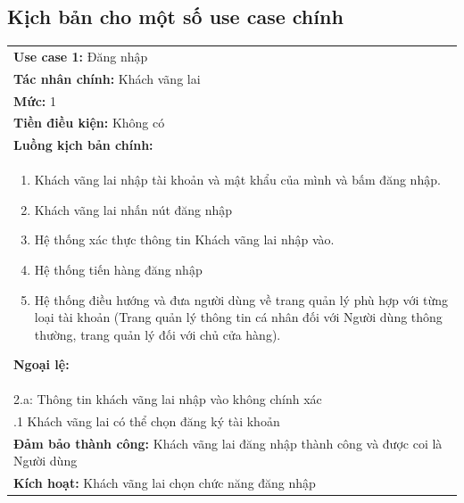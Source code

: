 \subsection{Kịch bản cho một số use case chính}
\begin{center}
\begin{tabularx}{\linewidth}{|X|}
\cline{1-2}
    \textbf{Use case 1:} Đăng nhập\\
    \textbf{Tác nhân chính:} Khách vãng lai\\
    \textbf{Mức:} 1\\
    \textbf{Tiền điều kiện:} Không có\\
    \textbf{Luồng kịch bản chính:}\\
    \begin{enumerate}
        \vspace{-2em}
        \itemsep-0.5em
        \item Khách vãng lai nhập tài khoản và mật khẩu của mình và bấm đăng nhập.
        \item Khách vãng lai nhấn nút đăng nhập
        \item Hệ thống xác thực thông tin Khách vãng lai nhập vào.
        \item Hệ thống tiến hàng đăng nhập
        \item Hệ thống điều hướng và đưa người dùng về trang quản lý phù hợp với từng loại tài khoản (Trang quản lý thông tin cá nhân đối với Người dùng thông thường, trang quản lý đối với chủ cửa hàng).
        \vspace{-1em}
    \end{enumerate}
    \textbf{Ngoại lệ:}\\
    \hspace{1em}2.a: Thông tin khách vãng lai nhập vào không chính xác\\
    \hspace{2.5em}.1 Khách vãng lai có thể chọn đăng ký tài khoản\\
    \textbf{Đảm bảo thành công:} Khách vãng lai đăng nhập thành công và được coi là Người dùng\\
    \textbf{Kích hoạt:} Khách vãng lai chọn chức năng đăng nhập
\cline{1-2}
\end{tabularx}
\end{center}

